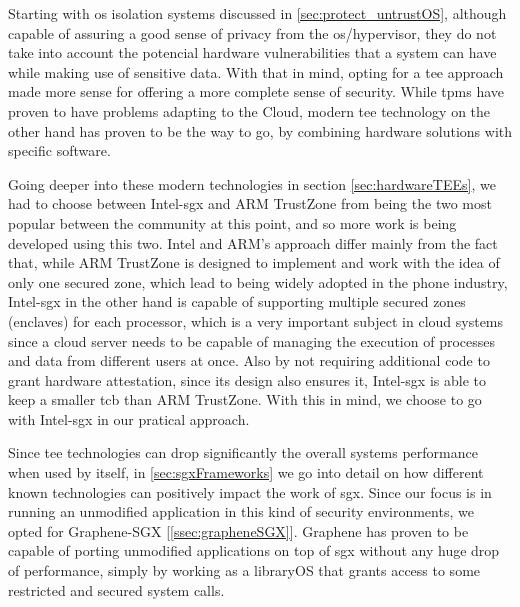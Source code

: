 Starting with \gls{os} isolation systems discussed in \ref{sec:protect_untrustOS}, although capable of assuring a good sense of privacy from the \gls{os}/hypervisor, they do not take into account the potencial hardware vulnerabilities that a system can have while making use of sensitive data. 
With that in mind, opting for a \gls{tee} approach made more sense for offering a more complete sense of security.
While \gls{tpm}s have proven to have problems adapting to the Cloud, modern \gls{tee} technology on the other hand has proven to be the way to go, by combining hardware solutions with specific software.

Going deeper into these modern technologies in section \ref{sec:hardwareTEEs}, we had to choose between Intel-\gls{sgx} and ARM TrustZone from being the two most popular between the community at this point, and so more work is being developed using this two. Intel and ARM's approach differ mainly from the fact that, while ARM TrustZone is designed to implement and work with the idea of only one secured zone, which lead to being widely adopted in the phone industry, Intel-\gls{sgx} in the other hand is capable of supporting multiple secured zones (enclaves) for each processor, which is a very important subject in cloud systems since a cloud server needs to be capable of managing the execution of processes and data from different users at once. Also by not requiring additional code to grant hardware attestation, since its design also ensures it, Intel-\gls{sgx} is able to keep a smaller \gls{tcb} than ARM TrustZone. With this in mind, we choose to go with Intel-\gls{sgx} in our pratical approach.

Since \gls{tee} technologies can drop significantly the overall systems performance when used by itself, in \ref{sec:sgxFrameworks} we go into detail on how different known technologies can positively impact the work of \gls{sgx}. Since our focus is in running an unmodified application in this kind of security environments, we opted for Graphene-SGX [\ref{ssec:grapheneSGX}]. Graphene has proven to be capable of porting unmodified applications on top of \gls{sgx} without any huge drop of performance, simply by working as a libraryOS that grants access to some restricted and secured system calls.








